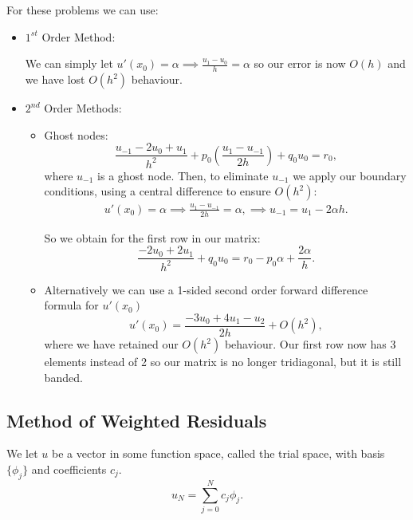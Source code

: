 \documentclass[12pt, a4paper]{article}
\theoremstyle{definition}
\theoremstyle{remark}
\numberwithin{equation}{section}
\begin{document}
For these problems we can use:
\begin{itemize}
\item $1^{st}$ Order Method:

We can simply let $u'(x_0)=\alpha \implies \frac{u_1-u_0}{h}=\alpha$ so our error is now $O(h)$ and we have lost $O(h^{2})$ behaviour.

\item $2^{nd}$ Order Methods:
\begin{itemize}
\item Ghost nodes:
\begin{equation*}
\frac{u_{-1}-2u_0+u_1}{h^2}+{p}_0\left(\frac{u_1-u_{-1}}{2h}\right) + q_0 u_0 = r_0,
\end{equation*}
where $u_{-1}$ is a ghost node. Then, to eliminate $u_{-1}$ we apply our boundary conditions, using a central difference to ensure $O(h^2)$:
\begin{align*}
u'(x_0)=\alpha \implies \frac{u_1-u_{-1}}{2h}=\alpha, 
\implies u_{-1} = u_1 -2\alpha h.
\end{align*}

So we obtain for the first row in our matrix:
\begin{equation*}
\frac{-2u_0+2u_1}{h^2} + q_0 u_0 = r_0 - {p}_0\alpha + \frac{2\alpha}{h}.
\end{equation*}

\item Alternatively we can use a 1-sided second order forward difference formula for $u'(x_0)$
\begin{equation*}
u'(x_0) = \frac{-3u_0 + 4u_1 - u_2}{2h}+O(h^2),
\end{equation*}
where we have retained our $O(h^2)$ behaviour. Our first row now has 3 elements instead of 2 so our matrix is no longer tridiagonal, but it is still banded.
\end{itemize}
\end{itemize}

\newpage

\subsection{Method of Weighted Residuals}
We let $u$ be a vector in some function space, called the trial space,  with basis $\{\phi_j\}$ and coefficients $c_j$.
\begin{equation*}
u_N = \sum_{j=0}^N c_j\phi_j.
\end{equation*}
\end{document}
